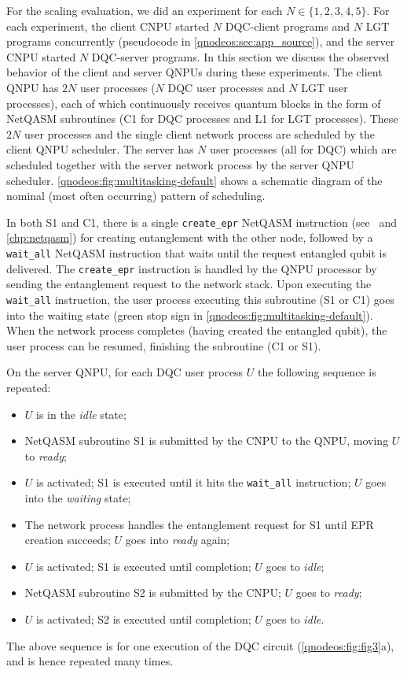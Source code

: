 For the scaling evaluation, we did an experiment for each $N \in \{1, 2, 3, 4, 5\}$. For each experiment, the client \ac{CNPU} started $N$ \ac{DQC}-client programs and $N$ \ac{LGT} programs concurrently (pseudocode in \cref{qnodeos:sec:app_source}), and the server \ac{CNPU} started $N$ \ac{DQC}-server programs. In this section we discuss the observed behavior of the client and server \acp{QNPU} during these experiments. The client \ac{QNPU} has $2N$ user processes ($N$ \ac{DQC} user processes and $N$ LGT user processes), each of which continuously receives quantum blocks in the form of \ac{NetQASM} subroutines (C1 for \ac{DQC} processes and L1 for \ac{LGT} processes). These $2N$ user processes and the single client network process are scheduled by the client \ac{QNPU} scheduler. The server has $N$ user processes (all for \ac{DQC}) which are scheduled together with the server network process by the server \ac{QNPU} scheduler. \cref{qnodeos:fig:multitasking-default} shows a schematic diagram of the nominal (most often occurring) pattern of scheduling.

In both S1 and C1, there is a single \texttt{create\_epr} \ac{NetQASM} instruction (see~\cite{dahlberg_2022_netqasm} and \cref{chp:netqasm}) for creating entanglement with the other node, followed by a \texttt{wait\_all} \ac{NetQASM} instruction that waits until the request entangled qubit is delivered. The \texttt{create\_epr} instruction is handled by the \ac{QNPU} processor by sending the entanglement request to the network stack. Upon executing the \texttt{wait\_all} instruction, the user process executing this subroutine (S1 or C1) goes into the waiting state (green stop sign in \cref{qnodeos:fig:multitasking-default}). When the network process completes (having created the entangled qubit), the user process can be resumed, finishing the subroutine (C1 or S1). 

On the server \ac{QNPU}, for each \ac{DQC} user process $U$ the following sequence is repeated:
%
\begin{itemize}
    \item $U$ is in the \textit{idle} state;
    \item \ac{NetQASM} subroutine S1 is submitted by the \ac{CNPU} to the \ac{QNPU}, moving $U$ to \textit{ready};
    \item $U$ is activated; S1 is executed until it hits the \texttt{wait\_all} instruction; $U$ goes into the \textit{waiting} state;
    \item The network process handles the entanglement request for S1 until \ac{EPR} creation succeeds; $U$ goes into \textit{ready} again;
    \item $U$ is activated; S1 is executed until completion; $U$ goes to \textit{idle};
    \item \ac{NetQASM} subroutine S2 is submitted by the \ac{CNPU}; $U$ goes to \textit{ready};
    \item $U$ is activated; S2 is executed until completion; $U$ goes to \textit{idle}.
\end{itemize}
%
The above sequence is for one execution of the \ac{DQC} circuit (\cref{qnodeos:fig:fig3}a), and is hence repeated many times.

